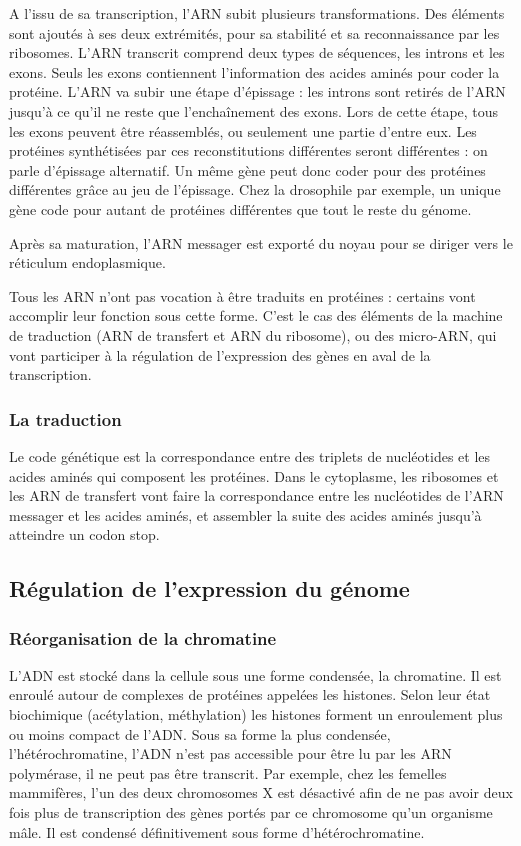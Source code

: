 \documentclass{report}
\begin{document}
A l'issu de sa transcription, l'ARN subit plusieurs transformations. Des éléments sont ajoutés à ses deux extrémités, pour sa stabilité et sa reconnaissance par les ribosomes. 
L'ARN transcrit comprend deux types de séquences, les introns et les exons. Seuls les exons contiennent l'information des acides aminés pour coder la protéine. 
L'ARN va subir une étape d'épissage : les introns sont retirés de l'ARN jusqu'à ce qu'il ne reste que l'enchaînement des exons. Lors de cette étape, tous les exons peuvent être réassemblés, ou seulement une partie d'entre eux. Les protéines synthétisées par ces reconstitutions différentes seront différentes : on parle d'épissage alternatif. 
Un même gène peut donc coder pour des protéines différentes grâce au jeu de l'épissage. Chez la drosophile par exemple, un unique gène code pour autant de protéines différentes que tout le reste du génome. 

Après sa maturation, l'ARN messager est exporté du noyau pour se diriger vers le réticulum endoplasmique.

Tous les ARN n'ont pas vocation à être traduits en protéines : certains vont accomplir leur fonction sous cette forme. C'est le cas des éléments de la machine de traduction (ARN de transfert et ARN du ribosome), ou des micro-ARN, qui vont participer à la régulation de l'expression des gènes en aval de la transcription.

\subsubsection{La traduction}

Le code génétique est la correspondance entre des triplets de nucléotides et les acides aminés qui composent les protéines. 
Dans le cytoplasme, les ribosomes et les ARN de transfert vont faire la correspondance entre les nucléotides de l'ARN messager et les acides aminés, et assembler la suite des acides aminés jusqu'à atteindre un codon stop. 


\subsection{Régulation de l'expression du génome}

\subsubsection{Réorganisation de la chromatine}

L'ADN est stocké dans la cellule sous une forme condensée, la chromatine. Il est enroulé autour de complexes de protéines appelées les histones. Selon leur état biochimique (acétylation, méthylation) les histones forment un enroulement plus ou moins compact de l'ADN. 
Sous sa forme la plus condensée, l'hétérochromatine, l'ADN n'est pas accessible pour être lu par les ARN polymérase, il ne peut pas être transcrit. Par exemple, chez les femelles mammifères, l'un des deux chromosomes X est désactivé afin de ne pas avoir deux fois plus de transcription des gènes portés par ce chromosome qu'un organisme mâle. Il est condensé définitivement sous forme d'hétérochromatine. 
\end{document}
